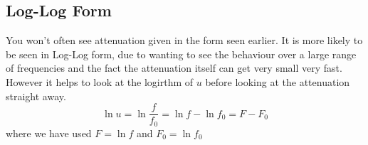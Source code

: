 \subsection{Log-Log Form}
You won't often see attenuation given in the form seen earlier. It is more likely
to be seen in Log-Log form, due to wanting to see the behaviour over a large range
of frequencies and the fact the attenuation itself can get very small very fast.
However it helps to look at the logirthm of $u$ before looking at the attenuation
straight away.
\begin{equation}
  \ln u = \ln \frac{f}{f_0} = \ln f - \ln f_0 = F - F_0
\end{equation}
where we have used $F=\ln f$ and $F_0 = \ln f_0 $
